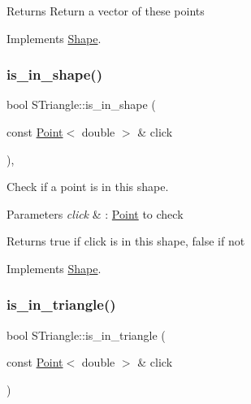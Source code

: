 \begin{DoxyReturn}{Returns}
Return a vector of these points 
\end{DoxyReturn}


Implements \hyperlink{classShape_add74a5c682840fa4a519242b1ddbd0b5}{Shape}.

\mbox{\label{classSTriangle_a5b55df6eb4af922521da69f69df77b42}} 
\subsubsection{\texorpdfstring{is\+\_\+in\+\_\+shape()}{is\_in\_shape()}}
{\footnotesize\ttfamily bool S\+Triangle\+::is\+\_\+in\+\_\+shape (\begin{DoxyParamCaption}\item[{const \hyperlink{classPoint}{Point}$<$ double $>$ \&}]{click }\end{DoxyParamCaption})\hspace{0.3cm}{\ttfamily [override]}, {\ttfamily [virtual]}}



Check if a point is in this shape. 


\begin{DoxyParams}{Parameters}
{\em click} & \+: \hyperlink{classPoint}{Point} to check \\
\hline
\end{DoxyParams}
\begin{DoxyReturn}{Returns}
true if click is in this shape, false if not 
\end{DoxyReturn}


Implements \hyperlink{classShape_aa09a621da090e42840b4bec7ffb27620}{Shape}.

\mbox{\label{classSTriangle_a6824246f68484d8d8159a3315df257a4}} 
\subsubsection{\texorpdfstring{is\+\_\+in\+\_\+triangle()}{is\_in\_triangle()}}
{\footnotesize\ttfamily bool S\+Triangle\+::is\+\_\+in\+\_\+triangle (\begin{DoxyParamCaption}\item[{const \hyperlink{classPoint}{Point}$<$ double $>$ \&}]{click }\end{DoxyParamCaption})}



